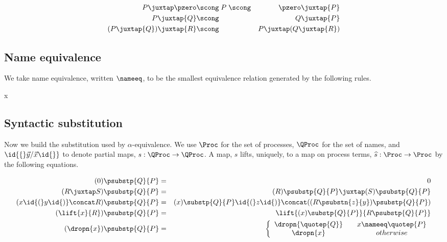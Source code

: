 \begin{eqnarray}
  {P} \juxtap \pzero	
  &  \scong \; {P} \; \scong & 
  \pzero \juxtap {P} \nonumber\\
  {P} \juxtap {Q}	
  & \scong & 
  {Q} \juxtap {P} \nonumber\\
  ({P} \juxtap {Q}) \juxtap {R}
  & \scong & 
  {P} \juxtap ({Q} \juxtap {R}) \nonumber
\end{eqnarray}

\subsection{Name equivalence}

We take name equivalence, written $\nameeq$, to be the smallest
equivalence relation generated by the following rules.

{  \nameeq x }

{  \nameeq {} }

\subsection{Syntactic substitution}

Now we build the substitution used by $\alpha$-equivalence. We use
$\Proc$ for the set of processes, $\QProc$ for the set of names, and
$\id{\{}\vec{y} / \vec{x} \id{\}}$ to denote partial maps, $s : \QProc
\rightarrow \QProc$. A map, $s$ lifts, uniquely, to a map on process terms, $\widehat{s} :
\Proc \rightarrow \Proc$ by the following equations.

\begin{eqnarray}
  (0) \psubstp{Q}{P}         & = &    0 \nonumber\\
  (R \juxtap S) \psubstp{Q}{P}
  & = &    
  (R)\psubstp{Q}{P} \juxtap (S) \psubstp{Q}{P} \nonumber\\
  (x \id{(} y\id{)}\concat R) \psubstp{Q}{P}    
  & = &    
  (x)\substp{Q}{P} \id{(}z\id{)}\concat( (R \psubstn{z}{y}) \psubstp{Q}{P} ) \nonumber\\
  (\lift{x}{R}) \psubstp{Q}{P}  
  & = &
  \lift{(x)\substp{Q}{P}}{ R \psubstp{Q}{P} } \nonumber\\
  (\dropn{x})  \psubstp{Q}{P}       
  & = & 
  \left\{ 
    \begin{array}{ccc} 
      \dropn{\quotep{Q}} & & x \nameeq \quotep{P} \\
      \dropn{x} & & otherwise \\
    \end{array}
  \right. \nonumber
\end{eqnarray}
 

